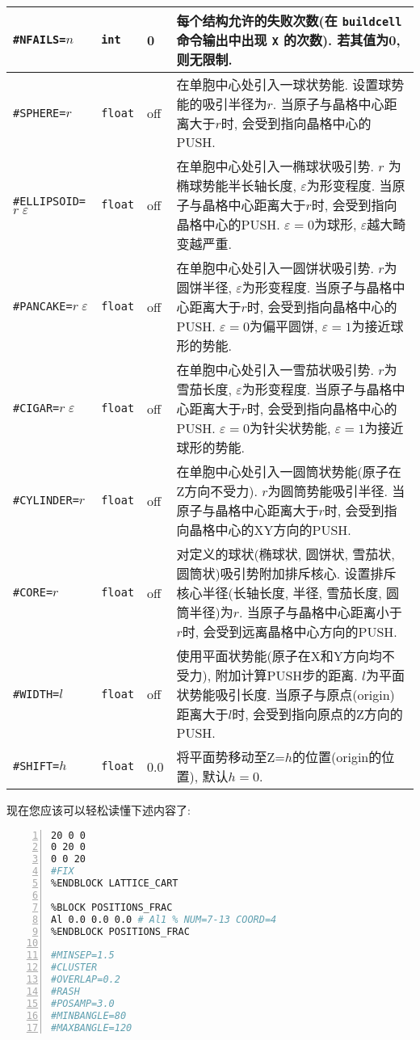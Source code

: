 \documentclass[a4paper, 10pt]{article}
\begin{document}
\begin{center}
\begin{longtable}{m{11em}|m{4em}<{\centering}|m{3em}<{\centering}|m{15em}}
\midrule
 \verb|#NFAILS=|\(n\)& \verb|int| & 0 & 每个结构允许的失败次数(在 \verb|buildcell| 命令输出中出现 \verb|X| 的次数). 若其值为0, 则无限制.\\
\midrule
 \verb|#SPHERE=|\(r\) & \verb|float| & off & 在单胞中心处引入一球状势能. 设置球势能的吸引半径为\(r\). 当原子与晶格中心距离大于\(r\)时, 会受到指向晶格中心的PUSH.\\
\midrule
 \verb|#ELLIPSOID=|\(r\;\varepsilon\) & \verb|float|  & off & 在单胞中心处引入一椭球状吸引势. \(r\) 为椭球势能半长轴长度, \(\varepsilon\)为形变程度. 当原子与晶格中心距离大于\(r\)时, 会受到指向晶格中心的PUSH. \(\varepsilon=0\)为球形, \(\varepsilon\)越大畸变越严重. \\
\midrule
 \verb|#PANCAKE=|\(r\;\varepsilon\) & \verb|float|  & off & 在单胞中心处引入一圆饼状吸引势. \(r\)为圆饼半径, \(\varepsilon\)为形变程度. 当原子与晶格中心距离大于\(r\)时, 会受到指向晶格中心的PUSH. \(\varepsilon=0\)为偏平圆饼, \(\varepsilon=1\)为接近球形的势能. \\
\midrule
 \verb|#CIGAR=|\(r\;\varepsilon\) & \verb|float| & off & 在单胞中心处引入一雪茄状吸引势. \(r\)为雪茄长度, \(\varepsilon\)为形变程度. 当原子与晶格中心距离大于\(r\)时, 会受到指向晶格中心的PUSH. \(\varepsilon=0\)为针尖状势能, \(\varepsilon=1\)为接近球形的势能. \\
\midrule
 \verb|#CYLINDER=|\(r\) & \verb|float| & off & 在单胞中心处引入一圆筒状势能(原子在Z方向不受力). \(r\)为圆筒势能吸引半径. 当原子与晶格中心距离大于\(r\)时, 会受到指向晶格中心的XY方向的PUSH.\\
\midrule
 \verb|#CORE=|\(r\) & \verb|float| & off & 对定义的球状(椭球状, 圆饼状, 雪茄状, 圆筒状)吸引势附加排斥核心. 设置排斥核心半径(长轴长度, 半径, 雪茄长度, 圆筒半径)为\(r\). 当原子与晶格中心距离小于\(r\)时, 会受到远离晶格中心方向的PUSH.\\
\midrule
 \verb|#WIDTH=|\(l\)& \verb|float| & off & 使用平面状势能(原子在X和Y方向均不受力), 附加计算PUSH步的距离. \(l\)为平面状势能吸引长度. 当原子与原点(origin)距离大于\(l\)时, 会受到指向原点的Z方向的PUSH.\\
\midrule
 \verb|#SHIFT=|\(h\)& \verb|float|& 0.0  & 将平面势移动至Z=\(h\)的位置(origin的位置), 默认\(h=0\).\\
\bottomrule
\end{longtable}
\end{center}

\newpage
现在您应该可以轻松读懂下述内容了:

\begin{lstlisting}[language={bash},numbers=left]
%BLOCK LATTICE_CART
20 0 0
0 20 0
0 0 20
#FIX
%ENDBLOCK LATTICE_CART

%BLOCK POSITIONS_FRAC
Al 0.0 0.0 0.0 # Al1 % NUM=7-13 COORD=4
%ENDBLOCK POSITIONS_FRAC

#MINSEP=1.5
#CLUSTER
#OVERLAP=0.2
#RASH
#POSAMP=3.0
#MINBANGLE=80
#MAXBANGLE=120
\end{lstlisting}
\end{document}
